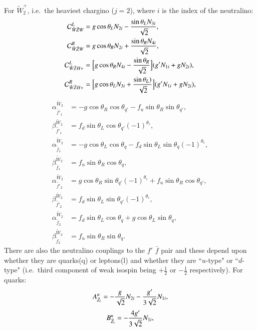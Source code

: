 \documentclass[final,3p,times,pdflatex]{elsarticle}
\begin{document}
For $\tilde{W}^{+}_{2}$, i.e.\ the heaviest chargino ($j = 2$), where $i$ is the index of the neutralino:
\begin{align}
\mathcal{C}_{\tilde{W} \tilde{Z} W}^L &= g\cos\theta_L N_{2i} - {\sin\theta_L N_{3i} \over \sqrt{2}}, \\
\mathcal{C}_{\tilde{W} \tilde{Z} W}^R &= g\cos\theta_R N_{2i} + {\sin\theta_R N_{4i} \over \sqrt{2}}, \\
\mathcal{C}_{\tilde{W} \tilde{Z} H+}^L &= \Big[g\cos\theta_R N_{4i} - {\sin\theta_R \over \sqrt{2}}\Big](g' N_{1i} + g N_{2i}), \\
\mathcal{C}_{\tilde{W} \tilde{Z} H+}^R &= \Big[g\cos\theta_L N_{3i} + {\sin\theta_L) \over \sqrt{2}}\Big](g' N_{1i} + g N_{2i}),
\end{align}
\begin{align}
\alpha_{\tilde{f'}_1}^{\tilde{W}_2} &= -g \cos\theta_R \cos\theta_{q'} - f_{u}\sin\theta_{R}\sin\theta_{q'}, \\
\beta_{\tilde{f'}_1}^{\tilde{W}_2} &= f_{d}\sin\theta_L \cos\theta_{q'}(-1)^{\theta_c}, \\
\alpha_{\tilde{f}_1}^{\tilde{W}_2} &= -g\cos\theta_L \cos\theta_q - f_{d}\sin\theta_L \sin\theta_q(-1)^{\theta_c}, \\
\beta_{\tilde{f}_1}^{\tilde{W}_2} &= f_{u}\sin\theta_R \cos\theta_q, \\
\alpha_{\tilde{f'}_2}^{\tilde{W}_2} &= g\cos\theta_R \sin\theta_{q'}(-1)^{\theta_c} + f_{u}\sin\theta_R \cos\theta_{q'}, \\
\beta_{\tilde{f'}_2}^{\tilde{W}_2} &= f_{d}\sin\theta_L \sin\theta_{q'}(-1)^{\theta_c}, \\
\alpha_{\tilde{f}_2}^{\tilde{W}_2} &= f_{d}\sin\theta_{L}\cos\theta_{q} + g\cos\theta_{L}\sin\theta_{q}, \\
\beta_{\tilde{f}_2}^{\tilde{W}_2} &= f_{u}\sin\theta_R\sin\theta_{q}.
\end{align}
There are also the neutralino couplings to the $f'$ $\bar{f}$ pair and these
depend upon whether they are quarks(q) or leptons(l) and whether they are
``$u$-type" or ``$d$-type" (i.e.\ third component of weak isospin being
$+\frac{1}{2}$ or $-\frac{1}{2}$ respectively).  
For quarks:
\begin{equation}
A_{\tilde{Z}_i}^{u} = -{g \over \sqrt{2}}N_{2i} - {g' \over 3 \sqrt{2}}N_{1i},
\end{equation}
\begin{equation}
B_{\tilde{Z}_i}^{u} = -{4 g' \over 3 \sqrt{2}}N_{1i},
\end{equation}
\end{document}

